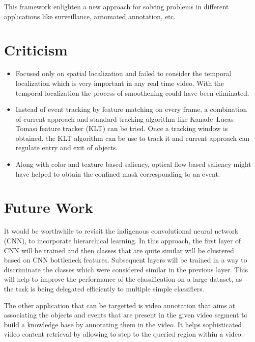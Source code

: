 \par This framework enlighten a new approach for solving problems in different applications like surveillance, automated annotation, etc.

\section{Criticism}
\begin{itemize}
	\item{Focused only on spatial localization and failed to consider the temporal localization which is very important in any real time video.  With the temporal localization the process of smoothening could have been eliminated.}
	\item{Instead of event tracking by feature matching on every frame, a combination of current approach and standard tracking algorithm like Kanade–Lucas–Tomasi feature tracker (KLT) can be tried.  Once a tracking window is obtained, the KLT algorithm can be use to track it and current approach can regulate entry and exit of objects.}
	\item{Along with color and texture based saliency, optical flow based saliency might have helped to obtain the confined mask corresponding to an event.}
\end{itemize}

\section{Future Work}
It would be worthwhile to revisit the indigenous convolutional neural network (CNN), to incorporate hierarchical learning.  In this approach, the first layer of CNN will be trained and then classes that are quite similar will be clustered based on CNN bottleneck features.  Subsequent layers will be trained in a way to discriminate the classes which were considered similar in the previous layer.  This will help to improve the performance of the classification on a large dataset, as the task is being delegated efficiently to multiple simple classifiers.
\par The other application that can be targetted is video annotation that aims at associating the objects and events that are present in the given video segment to build a knowledge base by annotating them in the video.  It helps sophisticated video content retrieval by allowing to step to the queried region within a video.